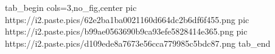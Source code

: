  
 
 
 
 


\ifcmt
  tab_begin cols=3,no_fig,center
     pic https://i2.paste.pics/62e2ba1ba0021160d664dc2b6df6f455.png
		 pic https://i2.paste.pics/b99ae0563690b9ca93efe5828414e365.png
		 pic https://i2.paste.pics/d109ede8a7673e56cca779985c5bdc87.png
  tab_end
\fi
